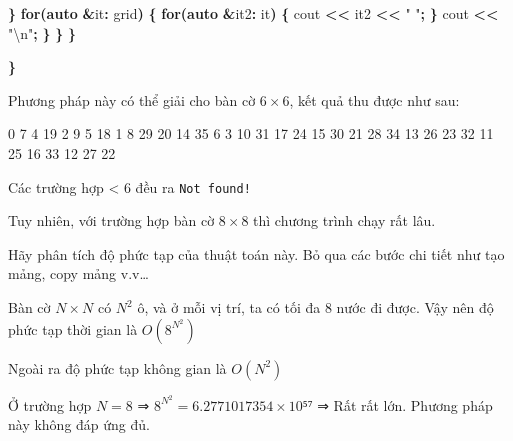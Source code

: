 \documentclass[
]{article}
\newenvironment{Shaded}{\begin{snugshade}}{\end{snugshade}}
\newcommand{\ControlFlowTok}[1]{\textcolor[rgb]{0.13,0.29,0.53}{\textbf{#1}}}
\newcommand{\DecValTok}[1]{\textcolor[rgb]{0.00,0.00,0.81}{#1}}
\newcommand{\KeywordTok}[1]{\textcolor[rgb]{0.13,0.29,0.53}{\textbf{#1}}}
\newcommand{\NormalTok}[1]{#1}
\newcommand{\OperatorTok}[1]{\textcolor[rgb]{0.81,0.36,0.00}{\textbf{#1}}}
\newcommand{\SpecialCharTok}[1]{\textcolor[rgb]{0.00,0.00,0.00}{#1}}
\newcommand{\StringTok}[1]{\textcolor[rgb]{0.31,0.60,0.02}{#1}}
\begin{document}
\begin{Shaded}
\begin{Highlighting}[]
            \OperatorTok{\}}
            \ControlFlowTok{for}\OperatorTok{(}\KeywordTok{auto} \OperatorTok{\&}\NormalTok{it}\OperatorTok{:}\NormalTok{ grid}\OperatorTok{)} \OperatorTok{\{}
                \ControlFlowTok{for}\OperatorTok{(}\KeywordTok{auto} \OperatorTok{\&}\NormalTok{it2}\OperatorTok{:}\NormalTok{ it}\OperatorTok{)} \OperatorTok{\{}
\NormalTok{                    cout }\OperatorTok{\textless{}\textless{}}\NormalTok{ it2 }\OperatorTok{\textless{}\textless{}} \StringTok{" "}\OperatorTok{;}
                \OperatorTok{\}}
\NormalTok{                cout }\OperatorTok{\textless{}\textless{}} \StringTok{"}\SpecialCharTok{\textbackslash{}n}\StringTok{"}\OperatorTok{;}
            \OperatorTok{\}}
        \OperatorTok{\}}
    \OperatorTok{\}}

\OperatorTok{\}}
\end{Highlighting}
\end{Shaded}

Phương pháp này có thể giải cho bàn cờ \(6\times 6\), kết quả thu được
như sau:

\begin{Shaded}
\begin{Highlighting}[]
\DecValTok{0} \DecValTok{7} \DecValTok{4} \DecValTok{19} \DecValTok{2} \DecValTok{9} 
\DecValTok{5} \DecValTok{18} \DecValTok{1} \DecValTok{8} \DecValTok{29} \DecValTok{20} 
\DecValTok{14} \DecValTok{35} \DecValTok{6} \DecValTok{3} \DecValTok{10} \DecValTok{31} 
\DecValTok{17} \DecValTok{24} \DecValTok{15} \DecValTok{30} \DecValTok{21} \DecValTok{28} 
\DecValTok{34} \DecValTok{13} \DecValTok{26} \DecValTok{23} \DecValTok{32} \DecValTok{11} 
\DecValTok{25} \DecValTok{16} \DecValTok{33} \DecValTok{12} \DecValTok{27} \DecValTok{22}
\end{Highlighting}
\end{Shaded}

Các trường hợp \textless{} 6 đều ra \texttt{Not\ found!}

Tuy nhiên, với trường hợp bàn cờ \(8\times 8\) thì chương trình chạy rất
lâu.

Hãy phân tích độ phức tạp của thuật toán này. Bỏ qua các bước chi tiết
như tạo mảng, copy mảng v.v\ldots{}

Bàn cờ \(N\times N\) có \(N^2\) ô, và ở mỗi vị trí, ta có tối đa \(8\)
nước đi được. Vậy nên độ phức tạp thời gian là \(O(8^{N^2})\)

Ngoài ra độ phức tạp không gian là \(O(N^2)\)

Ở trường hợp \(N=8\) ⇒ \(8^{N^2}= 6.2771017354×10⁵⁷\) ⇒ Rất rất lớn.
Phương pháp này không đáp ứng đủ.
\end{document}
